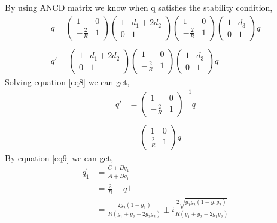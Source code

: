\documentclass{article}
\begin{document}
By using ANCD matrix we know when q satisfies the stability condition,
\begin{equation}\label{eq8}
	\begin{array}{l}
	q=\begin{pmatrix}
	1 & 0\\
	-\frac{2}{R} & 1
	\end{pmatrix}
	\begin{pmatrix}
	1 & d_1+2d_2\\
	0 & 1
	\end{pmatrix}
	\begin{pmatrix}
	1 & 0\\
	-\frac{2}{R} & 1
	\end{pmatrix}
	\begin{pmatrix}
	1 & d_3\\
	0 & 1
	\end{pmatrix}q
	\\
	\\
	q'=\begin{pmatrix}
	1 & d_1+2d_2\\
	0 & 1
	\end{pmatrix}
	\begin{pmatrix}
	1 & 0\\
	-\frac{2}{R} & 1
	\end{pmatrix}
	\begin{pmatrix}
	1 & d_3\\
	0 & 1
	\end{pmatrix}q
	\end{array}
\end{equation}
Solving equation \ref{eq8} we can get,
\begin{equation}\label{eq9}
	\begin{aligned}
	q'&=
	\begin{pmatrix}
	1 & 0\\
	-\frac{2}{R} & 1
	\end{pmatrix}^{-1}q\\
	\\
	&=
	\begin{pmatrix}
	1 & 0\\
	\frac{2}{R} & 1
	\end{pmatrix}q
	\end{aligned}
\end{equation}
By equation \ref{eq9} we can get,
\begin{equation}\label{eq10}
	\begin{aligned}
	q_{1}^{'}&=\frac{C+Dq_1}{A+Bq_1}\\
	&=\frac{2}{R}+q1\\
	&=\frac{2g_2(1-g_1)}{R(g_1+g_2-2g_2g_2)}\pm i\frac{2\sqrt{g_1g_2(1-g_1g_2)}}{R(g_1+g_2-2g_1g_2)}
	\end{aligned}
\end{equation}
\end{document}
